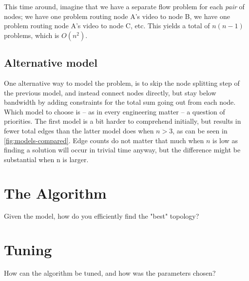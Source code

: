 This time around, imagine that we have a separate flow problem for each \emph{pair} of nodes; we have one problem routing node A's video to node B, we have one problem routing node A's video to node C, etc. This yields a total of $n(n-1)$ problems, which is $O(n^2)$.


\subsection{Alternative model}

One alternative way to model the problem, is to skip the node splitting step of the previous model, and instead connect nodes directly, but stay below bandwidth by adding constraints for the total sum going out from each node. Which model to choose is -- as in every engineering matter -- a question of priorities. The first model is a bit harder to comprehend initially, but results in fewer total edges than the latter model does when $n>3$, as can be seen in \autoref{fig:models-compared}. Edge counts do not matter that much when $n$ is low as finding a solution will occur in trivial time anyway, but the difference might be substantial when n is larger. 



\section{The Algorithm}

Given the model, how do you efficiently find the "best" topology?

\section{Tuning}

How can the algorithm be tuned, and how was the parameters chosen?
